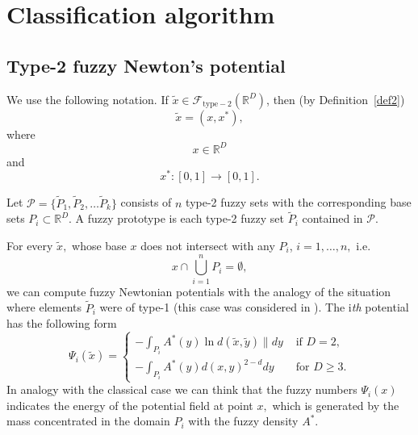\documentclass[leqno,12pt]{amsart}
\newcommand{\R}{\mathbb{R}}
\theoremstyle{remark}
\theoremstyle{remark}
\theoremstyle{remark}
\theoremstyle{definition}
\numberwithin{equation}{section}
\begin{document}
\section{Classification algorithm}
\subsection{Type-2 fuzzy Newton's potential}
We use the following notation.
If $\tilde x\in\mathcal F_{\mathrm{type-2}}(\R^D)$, then (by Definition~\ref{def2})
$$\tilde x=(x,x^*),$$
where $$x\in\R^D$$ and
$$x^*:[0,1]\to[0,1].$$
\par
Let $\mathcal P=\{\tilde P_1,\tilde P_2,\ldots \tilde P_k\}$ consists of $n$ type-2 fuzzy sets with the corresponding base sets $P_i\subset\R^D.$
A fuzzy prototype is each type-2 fuzzy set $\tilde P_i$ contained in $\mathcal P.$
\par
For every $\tilde x,$ whose base $x$ does not intersect
with any $P_i$, $i=1,\ldots,n,$ i.e.
$$x\cap\bigcup_{i=1}^nP_i=\emptyset,$$
we can compute fuzzy Newtonian potentials with the analogy of the situation where elements $\tilde P_i$ were of type-1 (this case was considered in \cite{UG}). The i{\em th} potential has the following form
\begin{equation}\label{Psi}
\Psi_i(\tilde x)=\begin{cases}-\int_{P_i}A^*(y)\ln d(\tilde x,\tilde y)\|dy&\text{ if $D=2$,}\\
-\int_{P_i}A^*(y)d(x,y)^{2-d}dy&\text{ for $D\geq 3$}.
\end{cases}
\end{equation}
In analogy with the classical case we can think that the fuzzy numbers $\Psi_i(x)$ indicates the energy of the potential field at point $x,$ which is generated by
the mass concentrated in the domain $P_i$ with the fuzzy density $A^*.$
\end{document}
